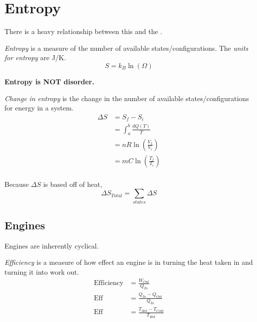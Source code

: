 \section{Entropy} \label{sec:Entropy}
There is a heavy relationship between this and the .
	\begin{definition}[Entropy] \label{def:Entropy}
		\emph{Entropy} is a measure of the number of available states/configurations.
		The \emph{units for entropy} are \si{\joule / \kelvin}.
		\begin{equation} \label{eq:Entropy}
			S = k_{B} \ln \left( \Omega \right)
		\end{equation}
		\begin{note}
			\textbf{Entropy is NOT disorder.}
		\end{note}
	\end{definition}
	\begin{definition} \label{def:Change in Entropy}
		\emph{Change in entropy} is the change in the number of available states/configurations for energy in a system.
		\begin{equation} \label{eq:Change in Entropy}
			\begin{aligned}
				\Delta S &= S_{f} - S_{i} \\
						 &= \int_{a}^{b} \frac{dQ \left( T \right)}{T} \\
						 &= nR \ln \left( \frac{V_{f}}{V_{i}} \right) \\
						 &= mC \ln \left( \frac{T_{f}}{T_{i}} \right) \\
			\end{aligned}
		\end{equation}
		\begin{note}
			Because $\Delta S$ is based off of heat,
			\begin{equation}
				\Delta S_{Total} = \sum_{states} \Delta S
			\end{equation}
		\end{note}
	\end{definition}

	\subsection{Engines} \label{subsec:Engines}
	Engines are inherently cyclical.
		\begin{definition}[Efficiency] \label{def:Efficiency}
			\emph{Efficiency} is a measure of how effect an engine is in turning the heat taken in and turning it into work out.
			\begin{equation} \label{eq:Efficiency}
				\begin{aligned}
					\text{Efficiency} &= \frac{W_{Out}}{Q_{In}} \\
					\text{Eff} &= \frac{Q_{In}-Q_{Out}}{Q_{In}} \\
					\text{Eff} &= \frac{T_{Hot}-T_{Cold}}{T_{Hot}} \\
				\end{aligned}
			\end{equation}
		\end{definition}
	
